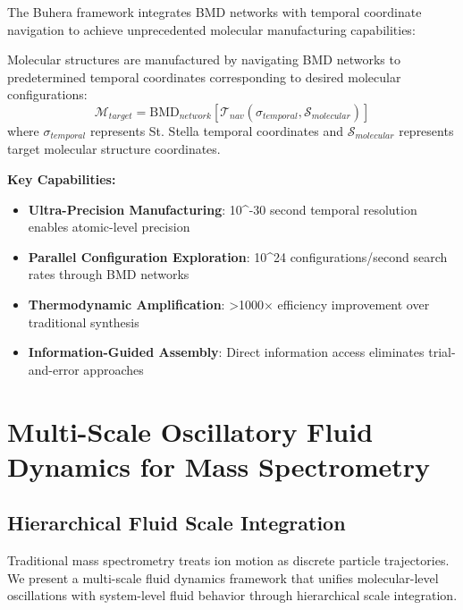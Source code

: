 The Buhera framework integrates BMD networks with temporal coordinate navigation to achieve unprecedented molecular manufacturing capabilities:

\begin{definition}
Molecular structures are manufactured by navigating BMD networks to predetermined temporal coordinates corresponding to desired molecular configurations:
$$\mathcal{M}_{target} = \text{BMD}_{network}[\mathcal{T}_{nav}(\sigma_{temporal}, \mathcal{S}_{molecular})]$$
where $\sigma_{temporal}$ represents St. Stella temporal coordinates and $\mathcal{S}_{molecular}$ represents target molecular structure coordinates.
\end{definition}

\textbf{Key Capabilities:}
\begin{itemize}
\item \textbf{Ultra-Precision Manufacturing}: 10^{-30} second temporal resolution enables atomic-level precision
\item \textbf{Parallel Configuration Exploration}: 10^{24} configurations/second search rates through BMD networks
\item \textbf{Thermodynamic Amplification}: >1000× efficiency improvement over traditional synthesis
\item \textbf{Information-Guided Assembly}: Direct information access eliminates trial-and-error approaches
\end{itemize}

\section{Multi-Scale Oscillatory Fluid Dynamics for Mass Spectrometry}

\subsection{Hierarchical Fluid Scale Integration}

Traditional mass spectrometry treats ion motion as discrete particle trajectories. We present a multi-scale fluid dynamics framework that unifies molecular-level oscillations with system-level fluid behavior through hierarchical scale integration.

